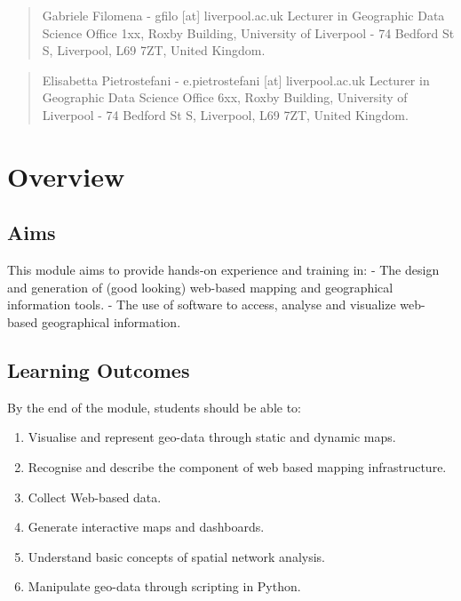 \documentclass[
  letterpaper,
  DIV=11,
  numbers=noendperiod]{scrreprt}
\providecommand{\tightlist}{%
  \setlength{\itemsep}{0pt}\setlength{\parskip}{0pt}}\usepackage{longtable,booktabs,array}
\begin{document}
\begin{quote}
Gabriele Filomena - gfilo {[}at{]} liverpool.ac.uk Lecturer in
Geographic Data Science Office 1xx, Roxby Building, University of
Liverpool - 74 Bedford St S, Liverpool, L69 7ZT, United Kingdom.
\end{quote}

\begin{quote}
Elisabetta Pietrostefani - e.pietrostefani {[}at{]} liverpool.ac.uk
Lecturer in Geographic Data Science Office 6xx, Roxby Building,
University of Liverpool - 74 Bedford St S, Liverpool, L69 7ZT, United
Kingdom.
\end{quote}


\chapter*{Overview}\label{overview}


\section*{Aims}\label{aims}


This module aims to provide hands-on experience and training in: - The
design and generation of (good looking) web-based mapping and
geographical information tools. - The use of software to access, analyse
and visualize web-based geographical information.

\section*{Learning Outcomes}\label{learning-outcomes}


By the end of the module, students should be able to:

\begin{enumerate}
\def\labelenumi{(\arabic{enumi})}
\setcounter{enumi}{1}
\tightlist
\item
  Visualise and represent geo-data through static and dynamic maps.
\item
  Recognise and describe the component of web based mapping
  infrastructure.
\item
  Collect Web-based data.
\item
  Generate interactive maps and dashboards.
\item
  Understand basic concepts of spatial network analysis.
\item
  Manipulate geo-data through scripting in Python.
\end{enumerate}
\end{document}
